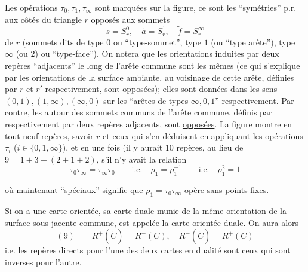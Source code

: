 
Les opérations $\tau_0,\tau_1,\tau_\infty$ sont marquées sur la figure, ce sont les ``symétries'' p.r. aux côtés du triangle $r$ opposés aux sommets
\[
s=S_r^0,\quad\widetilde a=S_r^1,\quad\widetilde f=S_r^\infty
\]
de $r$ (sommets dits de type $0$ ou ``type-sommet'', type $1$ (ou ``type arête''), type $\infty$ (ou $2$) ou ``type-face''). On notera que les orientations induites par deux repères ``adjacents'' le long de l'arête commune sont les mêmes (ce qui s'explique par les  orientations de la surface ambiante, au voisinage de cette arête, définies par $r$ et $r'$ respectivement, sont \uline{opposées}); elles sont données dans les sens $(0,1),(1,\infty),(\infty,0)$ sur les ``arêtes de types $\infty,0,1$'' respectivement. Par contre, les   autour des sommets communs de l'arête commune, définis par  respectivement par deux repères adjacents, sont \uline{opposées}. La figure montre en tout neuf repères, savoir $r$ et ceux qui s'en déduisent en appliquant  les opérations $\tau_i$ ($i\in\{0,1,\infty\}$), et en   une fois
(il y aurait 10 repères, au lieu de $9=1+3+(2+1+2)$, s'il n'y avait  la relation
\[
\tau_0\tau_\infty=\tau_\infty\tau_0\qquad\text{i.e.}\quad\rho_1=\rho_1^{-1}\qquad\text{i.e.}\quad\rho_1^2=1
\]


où maintenant ``spéciaux'' signifie que $\rho_1=\tau_0\tau_\infty$ opère sans points fixes.

Si on a une carte orientée, sa  carte duale munie de la \uline{même orientation de la surface sous-jacente commune}, est appelée la \uline{carte orientée duale}. On aura alors
\[
(9)\qquad R^+(\check C)=R^-(C),\quad R^-(\check C)=R^+(C)
\]
i.e. les repères directs pour l'une des deux cartes en dualité sont ceux qui sont inverses pour l'autre.

